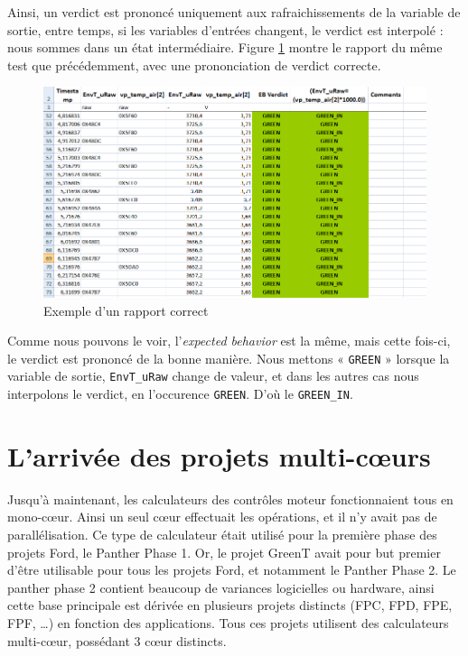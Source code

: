 Ainsi, un verdict est prononcé uniquement aux rafraichissements de la variable de sortie, entre temps, si les variables d'entrées changent, le verdict est interpolé : nous sommes dans un état intermédiaire. Figure \ref{fig:goodReport} montre le rapport du même test que précédemment, avec une prononciation de verdict correcte. 

\begin{figure}[h]
\centering
\includegraphics[width=0.9\linewidth]{contents/images/goodReport}
\caption{Exemple d'un rapport correct}
\label{fig:goodReport}
\end{figure}

Comme nous pouvons le voir, l'\textit{expected behavior} est la même, mais cette fois-ci, le verdict est prononcé de la bonne manière. Nous mettons « \texttt{GREEN} » lorsque la variable de sortie, \texttt{EnvT\_uRaw} change de valeur, et dans les autres cas nous interpolons le verdict, en l'occurence \texttt{GREEN}. D'où le \texttt{GREEN\_IN}.


\section{L'arrivée des projets multi-cœurs}
Jusqu'à maintenant, les calculateurs des contrôles moteur fonctionnaient tous en mono-cœur. Ainsi un seul c\oe{}ur effectuait les opérations, et il n'y avait pas de parallélisation. Ce type de calculateur était utilisé pour la première phase des projets Ford, le Panther Phase 1. Or, le projet GreenT avait pour but premier d'être utilisable pour tous les projets Ford, et notamment le Panther Phase 2. Le panther phase 2 contient beaucoup de variances logicielles ou hardware, ainsi cette base principale est dérivée en plusieurs projets distincts (FPC, FPD, FPE, FPF, \ldots) en fonction des applications. Tous ces projets utilisent des calculateurs multi-cœur, possédant 3 c\oe{}ur distincts. 

